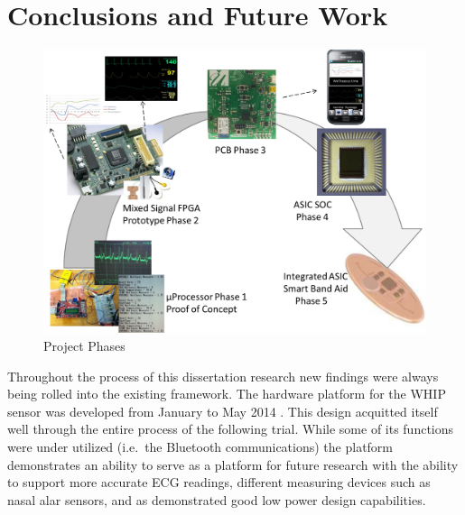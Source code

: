 \chapter{Conclusions and Future Work}
\label{chap:conclusions}

\begin{figure}
\centering
\includegraphics[width=0.7\linewidth]{Images/projectPhases}
\caption{Project Phases}
\label{fig:projectPhases}
\end{figure}


Throughout the process of this dissertation research new findings were always being rolled into the existing framework. The hardware platform for the WHIP sensor was developed from January to May 2014 . This design acquitted itself well through the entire process of the following trial. While some of its functions were under utilized (i.e.\ the Bluetooth communications) the platform demonstrates an ability to serve as a platform for future research with the ability to support more accurate ECG readings, different  measuring devices such as nasal alar sensors, and as demonstrated good low power design capabilities. 

